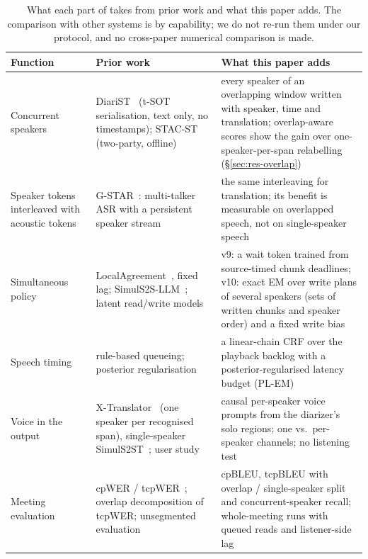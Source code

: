 \begin{table}[t]
\centering\footnotesize
\setlength{\tabcolsep}{3pt}
\begin{tabular}{p{3.3cm}p{5.4cm}p{6.0cm}}
\toprule
Function & Prior work & What this paper adds \\
\midrule
Concurrent speakers & DiariST~\citep{yang2024diarist} (t-SOT serialisation, text only, no timestamps); STAC-ST~\citep{zuluaga2023stac} (two-party, offline) & every speaker of an overlapping window written with speaker, time and translation; overlap-aware scores show the gain over one-speaker-per-span relabelling (\S\ref{sec:res-overlap}) \\
Speaker tokens interleaved with acoustic tokens & G-STAR~\citep{peng2026gstar}: multi-talker ASR with a persistent speaker stream & the same interleaving for translation; its benefit is measurable on overlapped speech, not on single-speaker speech \\
Simultaneous policy & LocalAgreement~\citep{liu2020low,polak2022cuni}, fixed lag; SimulS2S-LLM~\citep{deng2025simuls2s}; latent read/write models~\citep{arivazhagan2019milk,zhang2023hmt} & v9: a wait token trained from source-timed chunk deadlines; v10: exact EM over write plans of several speakers (sets of written chunks and speaker order) and a fixed write bias \\
Speech timing & rule-based queueing; posterior regularisation~\citep{ganchev2010posterior} & a linear-chain CRF over the playback backlog with a posterior-regularised latency budget (PL-EM) \\
Voice in the output & X-Translator~\citep{zhao2026xtranslator} (one speaker per recognised span), single-speaker SimulS2ST~\citep{seamless2023,labiausse2025hibiki,cheng2025liveinterpret}; user study~\citep{ma2026samevoice} & causal per-speaker voice prompts from the diarizer's solo regions; one vs.\ per-speaker channels; no listening test \\
Meeting evaluation & cpWER / tcpWER~\citep{watanabe2020chime6,neumann2023meeteval}; overlap decomposition of tcpWER; unsegmented evaluation~\citep{papi2025real} & cpBLEU, tcpBLEU with overlap / single-speaker split and concurrent-speaker recall; whole-meeting runs with queued reads and listener-side lag \\
\bottomrule
\end{tabular}
\caption{What each part of \sys{} takes from prior work and what this paper adds. The comparison with other systems is
by capability; we do not re-run them under our protocol, and no cross-paper numerical comparison is made.}
\label{tab:related7}
\end{table}



